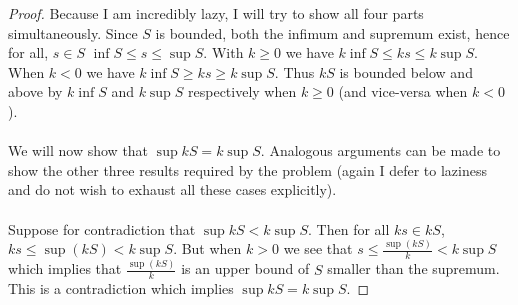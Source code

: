 \documentclass[]{article}
\newtheorem{lemma}{Lemma}
\begin{document}
\iffalse
\begin{lemma}
	If $S \subseteq \mathbb{R}$ is bounded, then $kS$ is bounded.
\end{lemma}
\begin{proof}
	We may assume, without loss of generality, that $S$ is nonempty. Indeed, if $S = \emptyset$ then $S$ being bounded is vacuously true. Since $S$ is bounded, there exists $M \in \mathbb{N}$ such that for all $s \in S, -M \leq s \leq M$. There are three cases we must consider:
	\begin{enumerate}
		\item[$k = 0$:] This case is trivial since $0S = \{0\}$ which is clearly bounded. 
		\item[$k > 0$:] Since $-M \leq s \leq M$ for all $s \in S$ it follows that $-kM \leq ks \leq kM$ for all $ks \in kS$. Thus $kS$ is bounded
		\item[$k < 0$:] This is similar to the previous case but with the inequalities reversed, $-kM \geq ks \geq kM$, hence $kS$ is bounded.
	\end{enumerate}
\end{proof}
	An immediate corollary to this lemma is that $kS$ has an infimum or supremum whenever $S$ has an infimum or supremum.
\fi
\begin{proof}
	Because I am incredibly lazy, I will try to show all four parts simultaneously. Since $S$ is bounded, both the infimum and supremum exist, hence for all, $s \in S$ $\inf S \leq s \leq \sup S$. With $k \geq 0$ we have $k\inf S \leq ks \leq k\sup S$. When $k < 0$ we have $k\inf S \geq ks \geq k\sup S$. Thus $kS$ is bounded below and above by $k\inf S$ and $k\sup S$ respectively when $k \geq 0$ (and vice-versa when $k < 0$).\\
	\\
	We will now show that $\sup kS = k\sup S$. Analogous arguments can be made to show the other three results required by the problem (again I defer to laziness and do not wish to exhaust all these cases explicitly).\\
	\\
	Suppose for contradiction that $\sup kS < k\sup S$. Then for all $ks \in kS$, $ks \leq \sup(kS) < k\sup S$. But when $k > 0$ we see that $s \leq \frac{\sup(kS)}{k} < k\sup S$ which implies that $\frac{\sup(kS)}{k}$ is an upper bound of $S$ smaller than the supremum. This is a contradiction which implies $\sup kS = k\sup S$.
\end{proof}
\end{document}
